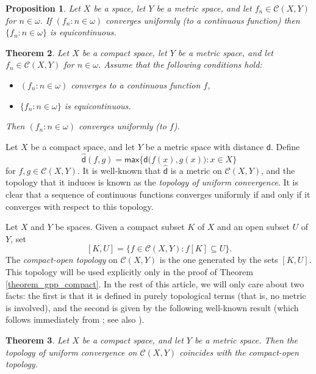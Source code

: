 \documentclass{amsart}
\theoremstyle{plain}
\newtheorem{theorem}{Theorem}[section]
\newtheorem{proposition}[theorem]{Proposition}
\theoremstyle{definition}
\newcommand{\maxi}{\mathsf{max}}
\newcommand{\di}{\mathsf{d}}
\newcommand{\CC}{\mathcal{C}}
\begin{document}
\begin{proposition}\label{proposition_equicontinuous}
Let $X$ be a space, let $Y$ be a metric space, and let $f_n\in\CC(X,Y)$ for $n\in\omega$. If $(f_n:n\in\omega)$ converges uniformly (to a continuous function) then $\{f_n:n\in\omega\}$ is equicontinuous.
\end{proposition}

\begin{theorem}\label{theorem_dini}
Let $X$ be a compact space, let $Y$ be a metric space, and let $f_n\in\CC(X,Y)$ for $n\in\omega$. Assume that the following conditions hold:
\begin{itemize}
\item $(f_n:n\in\omega)$ converges to a continuous function $f$,
\item $\{f_n:n\in\omega\}$ is equicontinuous.
\end{itemize}
Then $(f_n:n\in\omega)$ converges uniformly (to $f$).
\end{theorem}

Let $X$ be a compact space, and let $Y$ be a metric space with distance $\di$. Define
$$
\widehat{\di}(f,g)=\maxi\big\{\di\big(f(x),g(x)\big):x\in X\big\}
$$
for $f,g\in\CC(X,Y)$. It is well-known that $\widehat{\di}$ is a metric on $\CC(X,Y)$, and the topology that it induces is known as the \emph{topology of uniform convergence}. It is clear that a sequence of continuous functions converges uniformly if and only if it converges with respect to this topology.

Let $X$ and $Y$ be spaces. Given a compact subset $K$ of $X$ and an open subset $U$ of $Y$, set
$$
[K,U]=\{f\in\CC(X,Y):f[K]\subseteq U\}.
$$
The \emph{compact-open topology} on $\CC(X,Y)$ is the one generated by the sets $[K,U]$. This topology will be used explicitly only in the proof of Theorem \ref{theorem_gpp_compact}. In the rest of this article, we will only care about two facts: the first is that it is defined in purely topological terms (that is, no metric is involved), and the second is given by the following well-known result (which follows immediately from \cite[Theorems 46.2 and 46.8]{munkres}; see also \cite[Proposition 1.3.3]{van_mill_book}).

\begin{theorem}\label{theorem_compact_open}
Let $X$ be a compact space, and let $Y$ be a metric space. Then the topology of uniform convergence on $\CC(X,Y)$ coincides with the compact-open topology.
\end{theorem}
\end{document}
